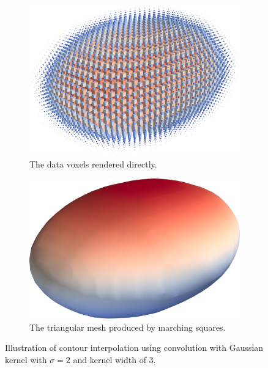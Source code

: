 \documentclass[a4paper,10pt]{report}
\begin{document}
\begin{figure}[H]
    \centering
    \begin{subfigure}{.49\textwidth}
        \includegraphics[width=\textwidth]{../images/3D/Ellipsoid_blocks_gaussian.png}
    \caption{The data voxels rendered directly.}
    \label{fig:Ellipsoid_blocks_gaussian}
    \end{subfigure}
    \hfill
    \begin{subfigure}{.49\textwidth}
        \includegraphics[width=\textwidth]{../images/3D/Ellipsoid_marching_squares_gaussian.png}
    \caption{The triangular mesh produced by marching squares.}
    \label{fig:Ellipsoid_marching_squares_gaussian}
    \end{subfigure}
    \caption{Illustration of contour interpolation using convolution with Gaussian kernel with $\sigma=2$ and kernel width of 3.}
    \label{fig:Ellipsoid_gaussian}
\end{figure}
\end{document}
